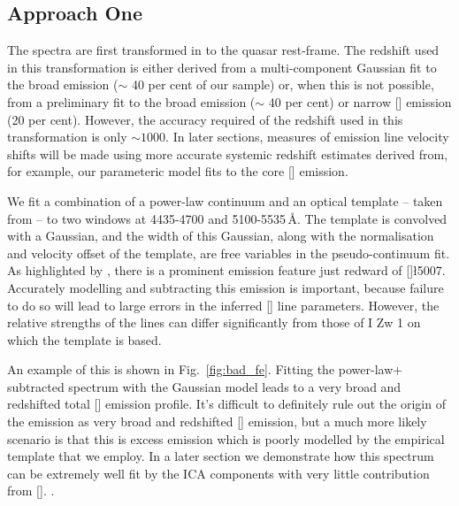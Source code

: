 \subsection{Approach One}

The spectra are first transformed in to the quasar rest-frame.
The redshift used in this transformation is either derived from a multi-component Gaussian fit to the broad \ha emission ($\sim$ 40 per cent of our sample) or, when this is not possible, from a preliminary fit to the broad \hb emission ($\sim$ 40 per cent) or narrow [] emission (20 per cent). 
However, the accuracy required of the redshift used in this transformation is only $\sim1000$\kms. 
In later sections, measures of emission line velocity shifts will be made using more accurate systemic redshift estimates derived from, for example, our parameteric model fits to the core [] emission. 

We fit a combination of a power-law continuum and an optical  template -- taken from \citet{boroson92} -- to two windows at 4435-4700 and 5100-5535\,\AA. 
The  template is convolved with a Gaussian, and the width of this Gaussian, along with the normalisation and velocity offset of the  template, are free variables in the pseudo-continuum fit.
As highlighted by \citet{netzer04}, there is a prominent  emission feature just redward of []\l5007.
Accurately modelling and subtracting this emission is important, because failure to do so will lead to large errors in the inferred [] line parameters. 
However, the relative strengths of the  lines can differ significantly from those of I Zw 1 on which the  template is based. 

An example of this is shown in Fig.~\ref{fig:bad_fe}. 
Fitting the power-law+ subtracted spectrum with the Gaussian model leads to a very broad and redshifted total [] emission profile. 
It's difficult to definitely rule out the origin of the emission as very broad and redshifted [] emission, but a much more likely scenario is that this is excess  emission which is poorly modelled by the empirical template that we employ. 
In a later section we demonstrate how this spectrum can be extremely well fit by the ICA components with very little contribution from []. 
. 

